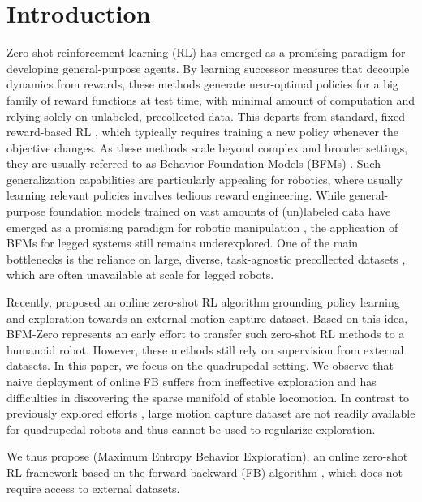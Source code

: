 \section{Introduction}
Zero-shot reinforcement learning (RL) \citep{touati2023does} has emerged as a promising paradigm for developing general-purpose agents. 
By learning successor measures that decouple dynamics from rewards, these methods generate near-optimal policies for a big family of reward functions at test time, with minimal amount of computation and relying solely on unlabeled, precollected data. 
This departs from standard, fixed-reward-based RL \citep{sutton1998introduction}, which typically requires training a new policy whenever the objective changes. 
As these methods scale beyond complex and broader settings, they are usually referred to as Behavior Foundation Models (BFMs) \citep{tirinzoni2025zeroshot}. Such generalization capabilities are particularly appealing for robotics, where usually learning relevant policies involves tedious reward engineering. While general-purpose foundation models trained on vast amounts of (un)labeled data have emerged as a promising paradigm for robotic manipulation \citep{intelligence2025pi, brohan2023rt,kim2024openvla}, the application of BFMs for legged systems still remains underexplored.
One of the main bottlenecks is the reliance on large, diverse, task-agnostic precollected datasets \citep{laskin2021urlb}, which are often unavailable at scale for legged robots. 

Recently, \citet{tirinzoni2025zeroshot} proposed an online zero-shot RL algorithm grounding policy learning and exploration towards an external motion capture dataset. Based on this idea, BFM-Zero \citep{li-2025} represents an early effort to transfer such zero-shot RL methods to a humanoid robot. However, these methods still rely on supervision from external datasets. 
In this paper, we focus on the quadrupedal setting. We observe that naive deployment of online FB suffers from ineffective exploration and has difficulties in discovering the sparse manifold of stable locomotion. In contrast to previously explored efforts \citep{li-2025}, large motion capture dataset are not readily available for quadrupedal robots and thus cannot be used to regularize exploration.

We thus propose \method (Maximum Entropy Behavior Exploration), an online zero-shot RL framework based on the forward-backward (FB) algorithm \citep{touati2021learning}, which does not require access to external datasets.



